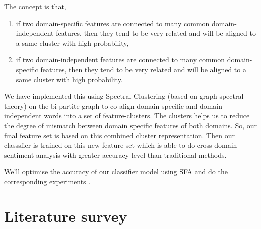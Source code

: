 \documentclass{report}
\begin{document}
\par The concept is that,
\begin{enumerate}[label=\arabic*.]
\item if two domain-specific features are connected to many common domain-independent features, then they tend to be very related and will be aligned to a same cluster with high probability,
\item  if two domain-independent features are connected to many common domain-specific features, then they tend to be very related and will be aligned to a same cluster with high probability.
\end{enumerate}
We have implemented this using Spectral Clustering (based on graph spectral theory) on the bi-partite graph to co-align domain-specific and domain-independent words into a set of feature-clusters. The clusters helps us to reduce the degree of mismatch between domain specific features of both domains. So, our final feature set is based on this combined cluster representation.
Then our classsfier is trained on this new feature set which is able to do cross domain sentiment analysis with greater accuracy level than traditional methods.

We'll optimise the accuracy of our classifier model using SFA and do the corresponding experiments .


\chapter{Literature survey}
\end{document}
